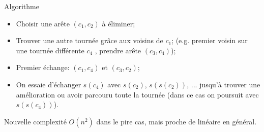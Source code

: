 \documentclass{beamer}
\begin{document}
\begin{frame}
\begin{exampleblock}{Algorithme}
\begin{itemize}
\item Choisir une arête $(c_1,c_2)$ à éliminer;
\item Trouver une autre tournée grâce aux voisins de $c_1$; (e.g. premier voisin sur une tournée différente $c_4$ , prendre arête $(c_3,c_4)$);
\item Premier échange: $(c_1,c_4)$ et $(c_3,c_2)$;
\item On essaie d'échanger $s(c_4)$ avec $s(c_2)$, $s(s(c_2))$, ... jusqu'à trouver une amélioration ou avoir parcouru toute la tournée (dans ce cas on poursuit avec $s(s(c_4))$).
\end{itemize}
\end{exampleblock}

\begin{alertblock}{Nouvelle complexité}
$O(n^2)$ dans le pire cas, mais proche de linéaire en général.
\end{alertblock}
\end{frame}
\end{document}
